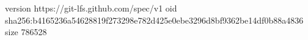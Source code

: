 version https://git-lfs.github.com/spec/v1
oid sha256:b4165236a54628819f273298e782d425e0ebe3296d8bf9362be14df0b88a4836
size 786528
